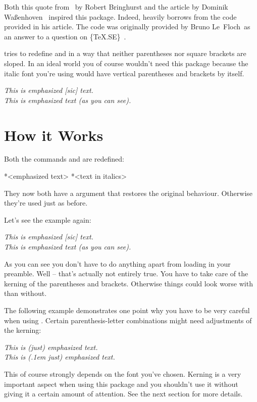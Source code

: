 \documentclass[DIV10,toc=index,toc=bib]{cnpkgdoc}
\begin{document}
\noindent
Both this quote from~ by Robert Bringhurst and the
article  by Dominik Waßenhoven~\cite{dtk12-dw} inspired
this package. Indeed, \embrac heavily borrows from the code \citeauthor{dtk12-dw}
provided in his article\manythanks. The code was originally provided by Bruno
Le~Floch\manythanks\ as an answer to a question on \{TeX.SE\}~\cite{lefloch11}.

\embrac tries to redefine  and  in a way that neither
parentheses nor square brackets are sloped. In an ideal world you of course
wouldn't need this package because the italic font you're using would have
vertical parentheses and brackets by itself.

\begin{beispiel}
 \emph{This is emphasized [sic] text.} \\
 \emph{This is emphasized text (as you can see).}
\end{beispiel}

\section{How it Works}
Both the commands  and  are redefined:
\begin{beschreibung}
 *{<emphasized text>}
 *{<text in italics>}
\end{beschreibung}
They now both have a \code{*} argument that restores the original behaviour.
Otherwise they're used just as before.

Let's see the example again:
\begin{beispiel}
 \emph{This is emphasized [sic] text.} \\
 \emph{This is emphasized text (as you can see).}
\end{beispiel}
As you can see you don't have to do anything apart from loading \embrac in your
preamble. Well -- that's actually not entirely true. You have to take care of the
kerning of the parentheses and brackets. Otherwise things could look worse with
\embrac than without.

The following example demonstrates one point why you have to be very careful
when using \embrac. Certain parenthesis-letter combinations might need adjustments
of the kerning:
\begin{beispiel}
 \emph{This is (just) emphasized text.} \\
 \emph{This is (\kern.1em just) emphasized text.}
\end{beispiel}
This of course strongly depends on the font you've chosen. Kerning is a very
important aspect when using this package and you shouldn't use it without giving
it a certain amount of attention. See the next section for more details.
\end{document}
